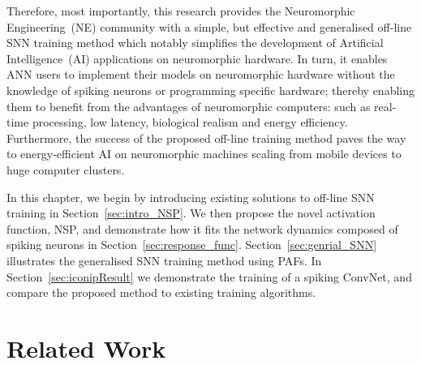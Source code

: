 Therefore, most importantly, this research provides the Neuromorphic Engineering~(NE) community with a simple, but effective and generalised off-line SNN training method which notably simplifies the development of Artificial Intelligence~(AI) applications on neuromorphic hardware.
In turn, it enables ANN users to implement their models on neuromorphic hardware without the knowledge of spiking neurons or programming specific hardware;
thereby enabling them to benefit from the advantages of neuromorphic computers: such as real-time processing, low latency, biological realism and energy efficiency.
Furthermore, the success of the proposed off-line training method paves the way to energy-efficient AI on neuromorphic machines scaling from mobile devices to huge computer clusters.



In this chapter, we begin by introducing existing solutions to off-line SNN training in Section~\ref{sec:intro_NSP}.
We then propose the novel activation function, NSP, and demonstrate how it fits the network dynamics composed of spiking neurons in Section~\ref{sec:response_func}.
Section~\ref{sec:genrial_SNN} illustrates the generalised SNN training method using PAFs.
In Section~\ref{sec:iconipResult} we demonstrate the training of a spiking ConvNet, and compare the proposed method to existing training algorithms.

\section{Related Work}
\label{sec:NSP_relate}

